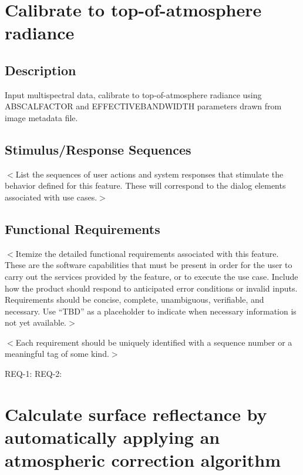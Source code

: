 \documentclass{scrreprt}
\begin{document}
\section{Calibrate to top-of-atmosphere radiance}
\subsection{Description}

Input multispectral data, calibrate to top-of-atmosphere radiance using ABSCALFACTOR and EFFECTIVEBANDWIDTH parameters 
drawn from image metadata file. 

\subsection{Stimulus/Response Sequences}
$<$List the sequences of user actions and system responses that stimulate the 
behavior defined for this feature. These will correspond to the dialog elements 
associated with use cases.$>$

\subsection{Functional Requirements}
$<$Itemize the detailed functional requirements associated with this feature.  
These are the software capabilities that must be present in order for the user 
to carry out the services provided by the feature, or to execute the use case.  
Include how the product should respond to anticipated error conditions or 
invalid inputs. Requirements should be concise, complete, unambiguous, 
verifiable, and necessary. Use “TBD” as a placeholder to indicate when necessary 
information is not yet available.$>$

$<$Each requirement should be uniquely identified with a sequence number or a 
meaningful tag of some kind.$>$

REQ-1:  REQ-2:

\section{Calculate surface reflectance by automatically applying an atmospheric correction algorithm}
\end{document}

